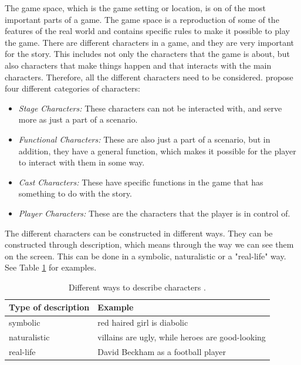 The game space, which is the game setting or location, is on of the most important parts of a game. The game space is a reproduction of some of the features of the real world and contains specific rules to make it possible to play the game. There are different characters in a game, and they are very important for the story. This includes not only the characters that the game is about, but also characters that make things happen and that interacts with the main characters. Therefore, all the different characters need to be considered. \cite{understandingvg} propose four different categories of characters: 

\begin{itemize}
\item \emph{Stage Characters:} These characters can not be interacted with, and serve more as just a part of a scenario. \\
\item \emph{Functional Characters:} These are also just a part of a scenario, but in addition, they have a general function, which makes it possible for the player to interact with them in some way. \\
\item \emph{Cast Characters:} These have specific functions in the game that has something to do with the story. \\
\item \emph{Player Characters:} These are the characters that the player is in control of. 
\end{itemize}

The different characters can be constructed in different ways. They can be constructed through description, which means through the way we can see them on the screen. This can be done in a symbolic, naturalistic or a "real-life" way. See Table \ref{tab:description} for examples.

\begin{table}
\centering
    \begin{tabular}{|l|l|}
        \hline
        \textbf{Type of description} & \textbf{Example} \\ \hline
       symbolic & red haired girl is diabolic  \\ \hline
       naturalistic & villains are ugly, while heroes are good-looking \\ \hline
       real-life & David Beckham as a football player \\ \hline
    \end{tabular}
    \caption[Different ways to describe characters]{Different ways to describe characters \cite{understandingvg}.}
    \label{tab:description}
\end{table} 

